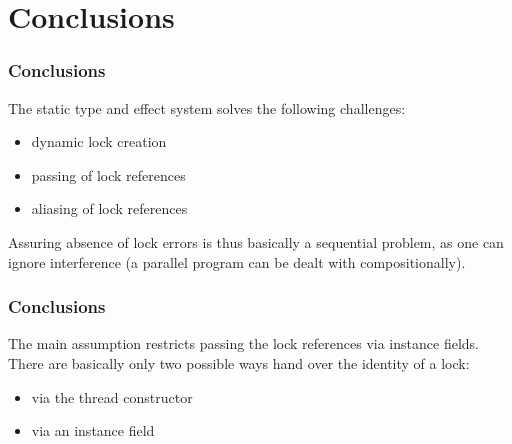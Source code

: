 \section{Conclusions}


\begin{frame}
\frametitle{Conclusions}
The static type and effect system solves the following challenges:
\begin{itemize}
    \item dynamic lock creation 
    \item passing of lock references
    \item aliasing of lock references
\end{itemize}

Assuring absence of lock errors is thus basically a sequential problem, as one can ignore interference (a parallel program can be dealt with compositionally).
\end{frame}



\begin{frame}
\frametitle{Conclusions}
The main assumption restricts passing the lock references via instance fields.
\\ \newline
There are basically only two possible ways hand over the identity of a lock:
\begin{itemize}
    \item via the thread constructor
    \item via an instance field
\end{itemize}
\end{frame}
